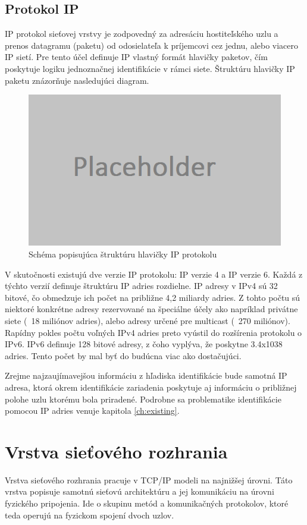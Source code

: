 \documentclass[
  digital, %
  table,   %
  lof,     %
  nolot,   %
  nocover
]{fithesis3}
\begin{document}
\subsection{Protokol IP}
IP protokol sieťovej vrstvy je zodpovedný za adresáciu hostiteľského uzlu a
prenos datagramu (paketu) od odosielateľa k príjemcovi cez jednu, alebo viacero
IP sietí. Pre tento účel definuje IP vlastný formát hlavičky paketov, čím
poskytuje logiku jednoznačnej identifikácie v rámci siete. Štruktúru hlavičky
IP paketu znázorňuje nasledujúci diagram.

\begin{figure}[h]
  \centering
    \includegraphics[width=.80\textwidth]{images/net-ip-head.png}
  \caption{Schéma popisujúca štruktúru hlavičky IP protokolu}
  \label{fig:net-ip-head}
\end{figure}

V skutočnosti existujú dve verzie IP protokolu: IP verzie 4 a IP verzie 6.
Každá z týchto verzií definuje štruktúru IP adries rozdielne. IP adresy v IPv4
sú 32 bitové, čo obmedzuje ich počet na približne 4,2 miliardy adries. Z tohto
počtu sú niektoré konkrétne adresy rezervované na špeciálne účely ako napríklad
privátne siete (~18 miliónov adries), alebo adresy určené pre multicast
(~270 miliónov). Rapídny pokles počtu voľných IPv4 adries preto vyústil do
rozšírenia protokolu o IPv6. IPv6 definuje 128 bitové adresy, z čoho vyplýva,
že poskytne 3.4x1038 adries. Tento počet by mal byť do budúcna viac ako
dostačujúci.

Zrejme najzaujímavejšou informáciu z hľadiska identifikácie bude samotná IP
adresa, ktorá okrem identifikácie zariadenia poskytuje aj informáciu o
približnej polohe uzlu ktorému bola priradené. Podrobne sa problematike
identifikácie pomocou IP adries venuje kapitola \ref{ch:existing}. 

\section{Vrstva sieťového rozhrania}
Vrstva sieťového rozhrania pracuje v TCP/IP modeli na najnižšej úrovni.
Táto vrstva popisuje samotnú sieťovú architektúru a jej komunikáciu na úrovni
fyzického pripojenia. Ide o skupinu metód a komunikačných protokolov, ktoré 
teda operujú na fyzickom spojení dvoch uzlov.
\end{document}
